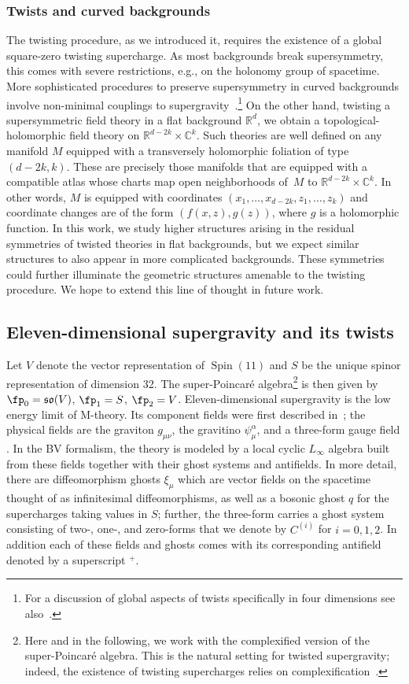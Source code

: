 \documentclass[10pt,a4paper]{amsart}
\numberwithin{equation}{section}
\theoremstyle{definition}
\def\R{\mathbb{R}}
\def\C{\mathbb{C}}
\def\lie#1{\ensuremath{\mathfrak{#1}}}
\DeclareMathOperator{\Spin}{Spin}
\def\so{\lie{so}}
\begin{document}
\subsubsection{Twists and curved backgrounds}
The twisting procedure, as we introduced it, requires the existence of a global square-zero twisting supercharge. As most backgrounds break supersymmetry, this comes with severe restrictions, e.g., on the holonomy group of spacetime. More sophisticated procedures to preserve supersymmetry in curved backgrounds involve non-minimal couplings to supergravity~\cite{Festuccia:2011ws}.\footnote{For a discussion of global aspects of twists specifically in four dimensions see also~\cite{Cushing:2023rha}.} On the other hand, twisting a supersymmetric field theory in a flat background $\R^d$, we obtain a topological-holomorphic field theory on $\R^{d-2k} \times \C^k$. Such theories are well defined on any manifold $M$ equipped with a transversely holomorphic foliation of type $(d-2k, k)$. These are precisely those manifolds that are equipped with a compatible atlas whose charts map open neighborhoods of~$M$ to $\R^{d-2k} \times \C^k$. In other words, $M$ is equipped with coordinates $(x_1, \dots, x_{d-2k}, z_{1}, \dots , z_k)$ and coordinate changes are of the form $(f(x,z), g(z))$, where $g$ is a holomorphic function. In this work, we study higher structures arising in the residual symmetries of twisted theories in flat backgrounds, but we expect similar structures to also appear in more complicated backgrounds. These symmetries could further illuminate the geometric structures amenable to the twisting procedure. We hope to extend this line of thought in future work.

\subsection{Eleven-dimensional supergravity and its twists}
Let $V$ denote the vector representation of $\Spin(11)$ and $S$ be the unique spinor representation of dimension 32. The super-Poincar\'e algebra\footnote{Here and in the following, we work with the complexified version of the super-Poincar\'e algebra. This is the natural setting for twisted supergravity; indeed, the existence of twisting supercharges relies on complexification~\cite{NV,ElliottSafronov}.} is then given by
$
 \fp_0 = \so(V)$, $\fp_1 = S$, $\fp_2 = V $.
Eleven-dimensional supergravity is the low energy limit of M-theory. Its component fields were first described in~\cite{CJS}; the physical fields are the graviton $g_{\mu \nu}$, the gravitino $\psi_\mu^\alpha$, and a three-form gauge field . In the BV formalism, the theory is modeled by a local cyclic $L_\infty$ algebra built from these fields together with their ghost systems and antifields. In more detail, there are diffeomorphism ghosts $\xi_\mu$ which are vector fields on the spacetime thought of as infinitesimal diffeomorphisms, as well as a bosonic ghost $q$ for the supercharges taking values in $S$; further, the three-form carries a ghost system consisting of two-, one-, and zero-forms that we denote by $C^{(i)}$ for $i=0,1,2$. In addition each of these fields and ghosts comes with its corresponding antifield denoted by a superscript $^+$.
\end{document}
